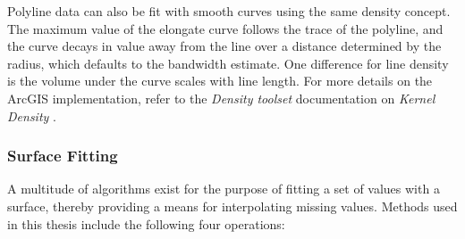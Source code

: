 Polyline data can also be fit with smooth curves using the same density concept. The maximum value of the elongate curve follows the trace of the polyline, and the curve decays in value away from the line over a distance determined by the radius, which defaults to the bandwidth estimate. One difference for line density is the volume under the curve scales with line length. For more details on the ArcGIS implementation, refer to the \textit{Density toolset} documentation on \textit{Kernel Density} \citep{esri_kernel_2021}.

\subsubsection{Surface Fitting}

A multitude of algorithms exist for the purpose of fitting a set of values with a surface, thereby providing a means for interpolating missing values. Methods used in this thesis include the following four operations:

